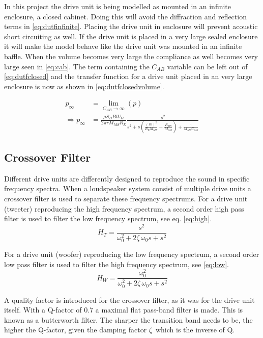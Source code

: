 In this project the drive unit is being modelled as mounted in an infinite enclosure, a closed cabinet. Doing this will avoid the diffraction and reflection terms in \cref{eq:dutfinfinite}.
Placing the drive unit in enclosure will prevent acoustic short circuiting as well.   
If the drive unit is placed in a very large sealed enclosure it will make the model behave like the drive unit was mounted in an infinite baffle.  
When the volume becomes very large the compliance as well becomes very large seen in \cref{eq:cab}. 
The term containing the $C_{AB}$ variable can be left out of \cref{eq:dutfclosed} and the transfer function for a drive unit placed in an very large enclosure is now as shown in \cref{eq:dutfclosedvolume}.

\begin{align}
	p_\infty &= \lim_{C_{AB}\rightarrow\infty}\left(p\right) \\
	\Rightarrow p_\infty &= \frac{\rho S_D B l U_G}{2\pi r M_{MS} R_E}\frac{s^2}{s^2 +s \left(\frac{(Bl)^2}{R_EM_{MS}}+\frac{R_{MS}}{M_{MS}}\right)+\frac{1}{M_{MS}C_{MS}}}
	\label{eq:dutfclosedvolume}
\end{align}

\subsection{Crossover Filter}
Different drive units are differently designed to reproduce the sound in specific frequency spectra.
When a loudspeaker system consist of multiple drive units a crossover filter is used to separate these frequency spectrums.
For a drive unit (tweeter) reproducing the high frequency spectrum, a second order high pass filter is used to filter the low frequency spectrum, see eq. \ref{eq:high}.\cite[p.~82-83]{Elektroakustik}
\begin{equation}
H_{T} = \frac{s^2}{\omega_0^2+2\zeta\,\omega_0 s+s^2}
\label{eq:high}
\end{equation}

For a drive unit (woofer) reproducing the low frequency spectrum, a second order low pass filter is used to filter the high frequency spectrum, see \cref{eq:low}.
\begin{equation}
H_{W} = \frac{\omega_0^2}{\omega_0^2+2\zeta\,\omega_0 s+s^2}
\label{eq:low}
\end{equation}

A quality factor is introduced for the crossover filter, as it was for the drive unit itself. 
With a Q-factor of 0.7 a maximal flat pass-band filter is made.
This is known as a butterworth filter. 
The sharper the transition band needs to be, the higher the Q-factor, given the damping factor $\zeta\,$ which is the inverse of Q. 

